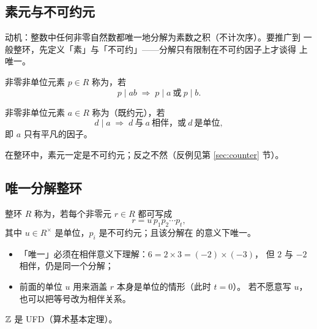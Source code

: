 \subsection{素元与不可约元}

动机：整数中任何非零自然数都唯一地分解为素数之积（不计次序）。要推广到
一般整环，先定义「素」与「不可约」——分解只有限制在不可约因子上才谈得
上唯一。

\begin{definition}
非零非单位元素 $p\in R$ 称为，若
\[
  p\mid ab \;\Longrightarrow\; p\mid a\ \text{或}\ p\mid b.
\]
\end{definition}

\begin{definition}
非零非单位元素 $a\in R$ 称为（既约元），若
\[
  d\mid a \;\Longrightarrow\; d\ \text{与}\ a\ \text{相伴，或}\
  d\ \text{是单位},
\]
即 $a$ 只有平凡的因子。
\end{definition}

\begin{proposition}[素元不可约]
在整环中，素元一定是不可约元；反之不然（反例见第 \ref{sec:counter} 节）。
\end{proposition}

\subsection{唯一分解整环}

\begin{definition}
整环 $R$ 称为，若每个非零元 $r\in R$ 都可写成
\[
  r = u\, p_1 p_2 \cdots p_t,
\]
其中 $u\in R^\times$ 是单位，$p_i$ 是不可约元；且该分解在
的意义下唯一。
\end{definition}

\begin{remark}
\leavevmode
\begin{itemize}[leftmargin=1.3em,itemsep=1pt]
  \item 「唯一」必须在相伴意义下理解：$6 = 2\times 3 = (-2)\times(-3)$，
        但 $2$ 与 $-2$ 相伴，仍是同一个分解；
  \item 前面的单位 $u$ 用来涵盖 $r$ 本身是单位的情形（此时 $t = 0$）。
        若不愿意写 $u$，也可以把等号改为相伴关系。
\end{itemize}
\end{remark}

\begin{example}
$\mathbb{Z}$ 是 UFD（算术基本定理）。
\end{example}
